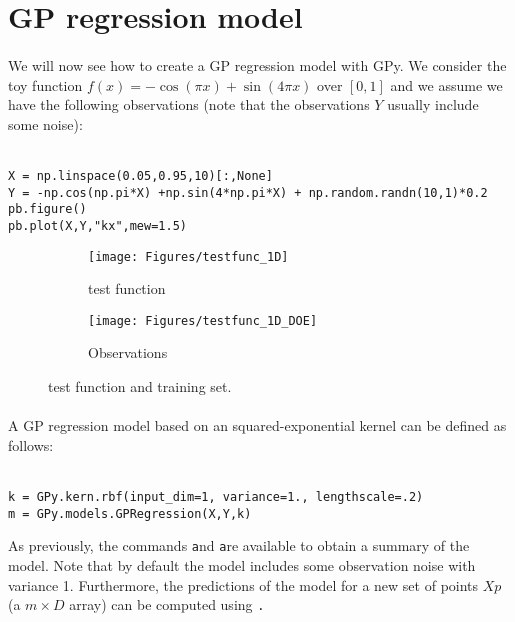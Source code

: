 \documentclass{article}
\newcommand{\mintinline}[1]{\colorbox{bg}{\lstinline[basicstyle=\ttfamily]{#1}}}
\begin{document}
\section{GP regression model}
\paragraph{}
We will now see how to create a GP regression model with GPy. We consider the
toy function $f(x) = -\cos(\pi x) + \sin(4 \pi x)$ over $[0,1]$ and we assume we
have the following observations (note that the observations $Y$ usually include
some noise):\\ \ \\
\begin{verbatim}
X = np.linspace(0.05,0.95,10)[:,None]
Y = -np.cos(np.pi*X) +np.sin(4*np.pi*X) + np.random.randn(10,1)*0.2
pb.figure()
pb.plot(X,Y,"kx",mew=1.5)
\end{verbatim}
\begin{figure}[ht]
    \begin{center}
        \begin{subfigure}[b]{0.5\textwidth}
                \centering
                \texttt{[image: Figures/testfunc\_1D]}
                \caption{test function}
        \end{subfigure}%
        \begin{subfigure}[b]{0.5\textwidth}
                \centering
                \texttt{[image: Figures/testfunc\_1D\_DOE]}
                \caption{Observations}
        \end{subfigure}%
    \end{center}
    \caption{test function and training set.}
    \label{fig:testfunc_1D}
\end{figure}

\paragraph{}
A GP regression model based on an squared-exponential kernel can be defined as
follows: \\ \ \\
\begin{verbatim}
k = GPy.kern.rbf(input_dim=1, variance=1., lengthscale=.2)
m = GPy.models.GPRegression(X,Y,k)
\end{verbatim}

As previously, the commands \texttt and \texttt are available to obtain a summary of the model. Note that by default the model includes some observation noise with variance 1. Furthermore, the predictions of the model for a new set of points $Xp$ (a $m \times D$ array) can be computed using \texttt.
\end{document}
